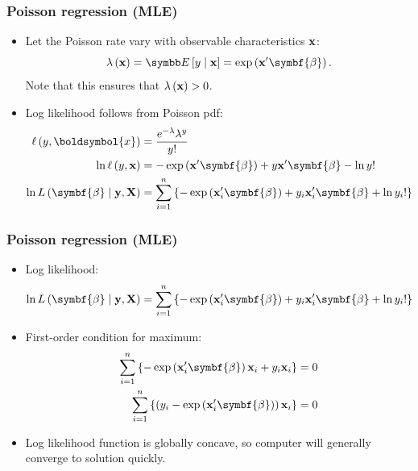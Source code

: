 \documentclass[aspectratio=169,11pt]{beamer}
\begin{document}
\begin{frame}
\frametitle{Poisson regression (MLE)} 
\begin{itemize}
\item  Let the Poisson rate vary with observable characteristics ${\bf x}$:\[
	\lambda \left({\bf x}\right) = \E\left[y \mid {\bf x}\right] = \exp\left({\bf x}'\symbf{\beta}\right).
	\]
	Note that this ensures that $\lambda\left({\bf x}\right) > 0$.

	\medskip
	\item Log likelihood follows from Poisson pdf:\begin{align*}
	\ell\left(y,\boldsymbol{x} \right) & =  \frac{e^{-\lambda}\lambda^{y}}{y!} \\
	\ln \ell\left(y,{\bf x}\right) &= -\exp\left({\bf x}'\symbf{\beta}\right) + y{\bf x}'\symbf{\beta} - \ln y! \\
	\ln L\left(\symbf{\beta} \mid {\bf y},{\bf X}\right) &=  \sum_{i=1}^{n}\left\{-\exp\left({\bf x}_{i}'\symbf{\beta} \right)+ y_i{\bf x}_{i}' \symbf{\beta} +\ln y_{i}!\right\}
	\end{align*}
\end{itemize}
\end{frame}


\begin{frame}
\frametitle{Poisson regression (MLE)} 
\begin{itemize}
	\item Log likelihood:\[
	\ln L\left(\symbf{\beta} \mid {\bf y},{\bf X}\right) =  \sum_{i=1}^{n}\left\{-\exp\left({\bf x}_{i}'\symbf{\beta} \right)+ y_i{\bf x}_{i}' \symbf{\beta} +\ln y_{i}!\right\}
	\]

	\item First-order condition for maximum:\begin{align*}
	  \sum_{i=1}^{n}\left\{-\exp\left({\bf x}_{i}'\symbf{\beta} \right) {\bf x}_{i} + y_i{\bf x}_{i} \right\} & =0\\
  \sum_{i=1}^{n}\left\{\left(y_i -\exp\left({\bf x}_{i}'\symbf{\beta} \right) \right) {\bf x}_{i} \right\} & =0
	\end{align*}

	\item Log likelihood function is globally concave, so computer will generally converge to solution quickly.
\end{itemize}
\end{frame}
\end{document}
